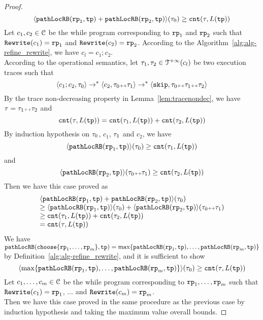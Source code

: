\begin{proof}
\[  \langle \mathtt{pathLocRB}(\mathtt{rp}_1, \mathtt{tp}) + \mathtt{pathLocRB}(\mathtt{rp}_2, \mathtt{tp}) \rangle(\mathtt{\tau}_0) \geq \mathtt{cnt}(\mathtt{\tau}, L(\mathtt{tp})) 
\]
Let $c_1, c_2 \in \mathcal{C}$ be the while program corresponding to $\mathtt{rp}_1$ and $\mathtt{rp}_2$ such that $\mathtt{Rewrite}(c_1) = \mathtt{rp}_1$ and $\mathtt{Rewrite}(c_2) = \mathtt{rp}_2$.
According to the Algorithm~\ref{alg:alg-refine_rewrite}, we have $c_l = c_1; c_2$.
\\
According to the operational semantics, let $\mathtt{\tau}_1, \mathtt{\tau}_2 \in \mathcal{T}^{+\infty}(c_l)$ be two execution traces such that 
\[
  \langle c_1; c_2, \mathtt{\tau}_0 \rangle \to^* \langle c_2, \mathtt{\tau}_0 {\scriptscriptstyle ++} \mathtt{\tau}_1 \rangle \to^* \langle \mathtt{skip}, \mathtt{\tau}_0 {\scriptscriptstyle ++} \mathtt{\tau}_1 {\scriptscriptstyle ++} \mathtt{\tau}_2 \rangle
\]
By the trace non-decreasing property in Lemma~\ref{lem:tracenondec}, we have $\mathtt{\tau} = \mathtt{\tau}_1 {\scriptscriptstyle ++} \mathtt{\tau}_2$ and 
\[
  \mathtt{cnt}(\mathtt{\tau}, L(\mathtt{tp}))  = \mathtt{cnt}(\mathtt{\tau}_1, L(\mathtt{tp}))  + \mathtt{cnt}(\mathtt{\tau}_2, L(\mathtt{tp})) 
\]
By induction hypothesis on $\mathtt{\tau}_0$, $c_1$, $\mathtt{\tau}_1$ and $c_2$, we have
\[
  \langle \mathtt{pathLocRB}(\mathtt{rp}_1, \mathtt{tp}) \rangle(\mathtt{\tau}_0) \geq \mathtt{cnt}(\mathtt{\tau}_1, L(\mathtt{tp})) 
\]
 and 
  \[
    \langle \mathtt{pathLocRB}(\mathtt{rp}_2, \mathtt{tp}) \rangle(\mathtt{\tau}_0 {\scriptscriptstyle ++} \mathtt{\tau}_1) \geq \mathtt{cnt}(\mathtt{\tau}_2, L(\mathtt{tp})) 
  \]
Then we have this case proved as
\[
  \begin{array}{l}
  \langle \mathtt{pathLocRB}(\mathtt{rp}_1, \mathtt{tp}) + \mathtt{pathLocRB}(\mathtt{rp}_2, \mathtt{tp}) \rangle(\mathtt{\tau}_0)
  \\
  \geq \langle \mathtt{pathLocRB}(\mathtt{rp}_1, \mathtt{tp}) \rangle(\mathtt{\tau}_0) + \langle \mathtt{pathLocRB}(\mathtt{rp}_2, \mathtt{tp}) \rangle(\mathtt{\tau}_0 {\scriptscriptstyle ++} \mathtt{\tau}_1)
  \\
  \geq \mathtt{cnt}(\mathtt{\tau}_1, L(\mathtt{tp}))  + \mathtt{cnt}(\mathtt{\tau}_2, L(\mathtt{tp})) 
  \\
  = \mathtt{cnt}(\mathtt{\tau}, L(\mathtt{tp}))
  \end{array}
  \] 
We have $\outinB(\rpchoose{\rprog_1, \ldots, \rprog_m }, \tpath) = \max\left\{ \outinB(\rprog_1, \tpath), \ldots, \outinB(\rprog_m, \tpath) \right\}$ by Definition~\ref{alg:alg-refine_rewrite}, and
it is sufficient to show
\[
  \config{\max\left\{ \outinB(\rprog_1, \tpath), \ldots, \outinB(\rprog_m, \tpath) \right\}}(\trace_0) \geq \counter(\trace, L(\tpath)) 
\]
Let $c_1, \ldots, c_m \in \mathcal{C}$ be the while program corresponding to $\mathtt{rp}_1, \ldots, \mathtt{rp}_m$ such that $\mathtt{Rewrite}(c_1) = \mathtt{rp}_1$, $\ldots$ and  $\mathtt{Rewrite}(c_m) = \mathtt{rp}_m$.
\\
Then we have this case proved in the same procedure as the previous case by induction hypothesis and taking the maximum value overall bounds.

\end{proof}
